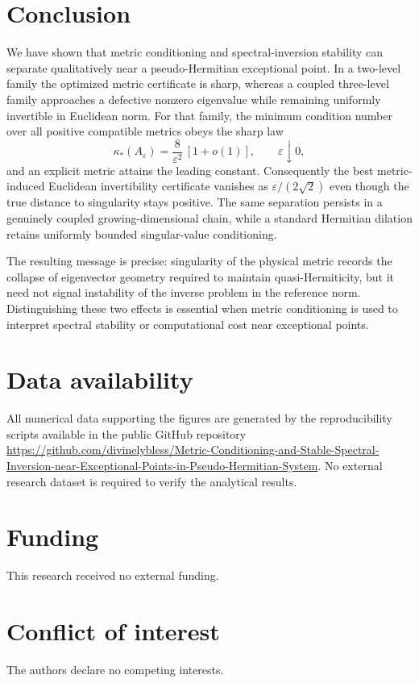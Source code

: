 \section{Conclusion}
We have shown that metric conditioning and spectral-inversion stability can separate
qualitatively near a pseudo-Hermitian exceptional point.  In a two-level family the optimized
metric certificate is sharp, whereas a coupled three-level family approaches a defective
nonzero eigenvalue while remaining uniformly invertible in Euclidean norm.  For that family,
the minimum condition number over all positive compatible metrics obeys the sharp law
\[
 \kappa_*(A_\varepsilon)=\frac{8}{\varepsilon^2}\,[1+o(1)],
 \qquad \varepsilon\downarrow0,
\]
and an explicit metric attains the leading constant.  Consequently the best metric-induced
Euclidean invertibility certificate vanishes as $\varepsilon/(2\sqrt2)$ even though the true
distance to singularity stays positive.  The same separation persists in a genuinely coupled
growing-dimensional chain, while a standard Hermitian dilation retains uniformly bounded
singular-value conditioning.

The resulting message is precise: singularity of the physical metric records the collapse of
eigenvector geometry required to maintain quasi-Hermiticity, but it need not signal instability
of the inverse problem in the reference norm.  Distinguishing these two effects is essential
when metric conditioning is used to interpret spectral stability or computational cost near
exceptional points.

\section*{Data availability}
All numerical data supporting the figures are generated by the reproducibility scripts available
in the public GitHub repository
\url{https://github.com/divinelybless/Metric-Conditioning-and-Stable-Spectral-Inversion-near-Exceptional-Points-in-Pseudo-Hermitian-System}.
No external research dataset is required to verify the analytical results.

\section*{Funding}
This research received no external funding.

\section*{Conflict of interest}
The authors declare no competing interests.



